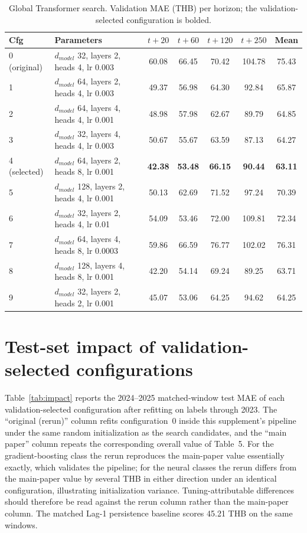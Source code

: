 \documentclass[11pt]{article}
\begin{document}
\begin{table}[htbp]\centering
\caption{Global Transformer search. Validation MAE (THB) per horizon; the validation-selected configuration is bolded.}
\label{tab:tf}
\scriptsize
\setlength{\tabcolsep}{3.5pt}
\begin{tabular}{llccccc}
\toprule
Cfg & Parameters & $t{+}20$ & $t{+}60$ & $t{+}120$ & $t{+}250$ & Mean \\
\midrule
0 (original) & $d_{model}$ 32, layers 2, heads 4, lr 0.003 & 60.08 & 66.45 & 70.42 & 104.78 & 75.43 \\
1 & $d_{model}$ 64, layers 2, heads 4, lr 0.003 & 49.37 & 56.98 & 64.30 & 92.84 & 65.87 \\
2 & $d_{model}$ 64, layers 4, heads 4, lr 0.001 & 48.98 & 57.98 & 62.67 & 89.79 & 64.85 \\
3 & $d_{model}$ 32, layers 4, heads 4, lr 0.003 & 50.67 & 55.67 & 63.59 & 87.13 & 64.27 \\
4 (selected) & $d_{model}$ 64, layers 2, heads 8, lr 0.001 & \textbf{42.38} & \textbf{53.48} & \textbf{66.15} & \textbf{90.44} & \textbf{63.11} \\
5 & $d_{model}$ 128, layers 2, heads 4, lr 0.001 & 50.13 & 62.69 & 71.52 & 97.24 & 70.39 \\
6 & $d_{model}$ 32, layers 2, heads 4, lr 0.01 & 54.09 & 53.46 & 72.00 & 109.81 & 72.34 \\
7 & $d_{model}$ 64, layers 4, heads 8, lr 0.0003 & 59.86 & 66.59 & 76.77 & 102.02 & 76.31 \\
8 & $d_{model}$ 128, layers 4, heads 8, lr 0.001 & 42.20 & 54.14 & 69.24 & 89.25 & 63.71 \\
9 & $d_{model}$ 32, layers 2, heads 2, lr 0.001 & 45.07 & 53.06 & 64.25 & 94.62 & 64.25 \\
\bottomrule
\end{tabular}
\end{table}

\section{Test-set impact of validation-selected configurations}
Table~\ref{tab:impact} reports the 2024--2025 matched-window test MAE of each validation-selected configuration after refitting on labels through 2023. The ``original (rerun)'' column refits configuration~0 inside this supplement's pipeline under the same random initialization as the search candidates, and the ``main paper'' column repeats the corresponding overall value of Table~5. For the gradient-boosting class the rerun reproduces the main-paper value essentially exactly, which validates the pipeline; for the neural classes the rerun differs from the main-paper value by several THB in either direction under an identical configuration, illustrating initialization variance. Tuning-attributable differences should therefore be read against the rerun column rather than the main-paper column. The matched Lag-1 persistence baseline scores 45.21 THB on the same windows.
\end{document}
